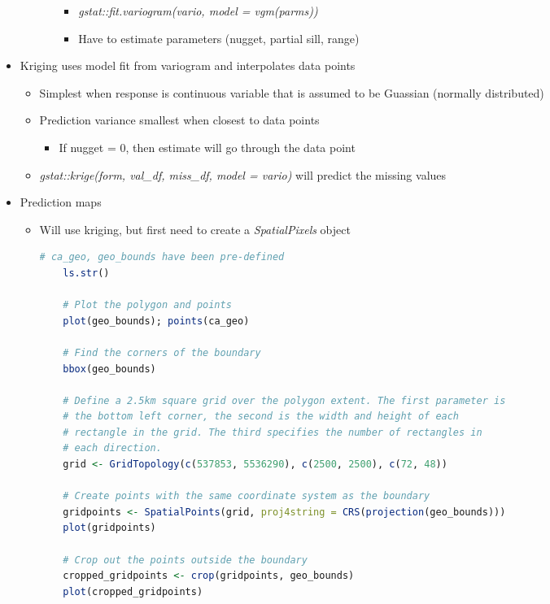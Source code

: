 \documentclass{article}
\begin{document}
\begin{itemize}
\begin{itemize}
\begin{itemize}
\begin{itemize}
                \item \textit{gstat::fit.variogram(vario, model = vgm(parms))}
                \item Have to estimate parameters (nugget, partial sill, range)
            \end{itemize}
        \end{itemize}
    \end{itemize}
    \item Kriging uses model fit from variogram and interpolates data points
    \begin{itemize}
        \item Simplest when response is continuous variable that is assumed to be Guassian (normally distributed)
        \item Prediction variance smallest when closest to data points
        \begin{itemize}
            \item If nugget = 0, then estimate will go through the data point
        \end{itemize}
        \item \textit{gstat::krige(form, val\_df, miss\_df, model = vario)} will predict the missing values
    \end{itemize}
    \item Prediction maps
    \begin{itemize}
        \item Will use kriging, but first need to create a \textit{SpatialPixels} object
        
\begin{lstlisting}[language=R]
    # ca_geo, geo_bounds have been pre-defined
    ls.str()

    # Plot the polygon and points
    plot(geo_bounds); points(ca_geo)

    # Find the corners of the boundary
    bbox(geo_bounds)

    # Define a 2.5km square grid over the polygon extent. The first parameter is
    # the bottom left corner, the second is the width and height of each 
    # rectangle in the grid. The third specifies the number of rectangles in
    # each direction.
    grid <- GridTopology(c(537853, 5536290), c(2500, 2500), c(72, 48))

    # Create points with the same coordinate system as the boundary
    gridpoints <- SpatialPoints(grid, proj4string = CRS(projection(geo_bounds)))
    plot(gridpoints)

    # Crop out the points outside the boundary
    cropped_gridpoints <- crop(gridpoints, geo_bounds)
    plot(cropped_gridpoints)


\end{lstlisting}
\end{itemize}
\end{itemize}
\end{document}
